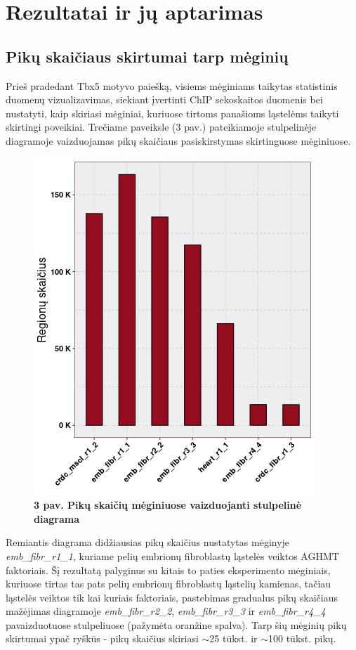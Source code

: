 \documentclass[12pt]{article}
\begin{document}
\newpage



\section{Rezultatai ir jų aptarimas}
\subsection{Pikų skaičiaus skirtumai tarp mėginių}
Prieš pradedant Tbx5 motyvo paiešką, visiems mėginiams taikytas statistinis
duomenų vizualizavimas, siekiant įvertinti ChIP sekoskaitos duomenis bei
nustatyti, kaip skiriasi mėginiai, kuriuose tirtoms panašioms ląstelėms
taikyti skirtingi poveikiai.
Trečiame paveiksle (3 pav.) pateikiamoje stulpelinėje diagramoje vaizduojamas
pikų skaičiaus pasiskirstymas skirtinguose mėginiuose.

\begin{figure}[htb]
    \begin{center}
        \includegraphics[width=0.5\linewidth]{../Figures/total_peak_counts.png}
        \vspace{-2\baselineskip}
        \caption*{\small\textbf{3 pav. Pikų skaičių mėginiuose vaizduojanti
                                stulpelinė diagrama}}
    \end{center}
\end{figure}

Remiantis diagrama didžiausias pikų skaičius
nustatytas mėginyje \small\emph{emb\_fibr\_r1\_1}, kuriame pelių embrionų
fibroblastų ląstelės veiktos AGHMT faktoriais.
Šį rezultatą palyginus su kitais to paties eksperimento mėginiais, kuriuose
tirtas tas pats pelių embrionų fibroblastų ląstelių kamienas, tačiau ląstelės
veiktos tik kai kuriais faktoriais, pastebimas gradualus pikų skaičiaus
mažėjimas diagramoje
\small\emph{emb\_fibr\_r2\_2}, \small\emph{emb\_fibr\_r3\_3} ir
\small\emph{emb\_fibr\_r4\_4} pavaizduotuose stulpeliuose (pažymėta
oranžine spalva). Tarp šių mėginių pikų skirtumai ypač ryškūs - pikų
skaičius skiriasi \(\sim\)25 tūkst. ir \(\sim\)100 tūkst. pikų.
\end{document}
